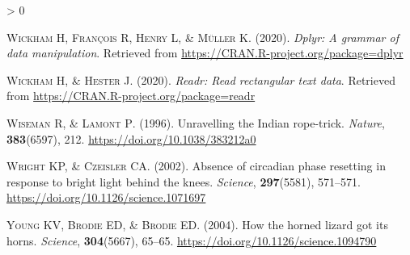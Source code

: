 \documentclass[
  a4paper,
]{article}
\newlength{\cslhangindent}
\newenvironment{CSLReferences}[2] %
 {%
  \setlength{\parindent}{0pt}
  \ifodd #1 \everypar{\setlength{\hangindent}{\cslhangindent}}\ignorespaces\fi
  \ifnum #2 > 0
  \setlength{\parskip}{#2\baselineskip}
  \fi
 }%
 {}
\begin{document}
\begin{CSLReferences}{1}{0}
\leavevmode\hypertarget{ref-R-dplyr}{}%
\textsc{Wickham H, François R, Henry L, \& Müller K}. (2020). \emph{Dplyr: A grammar of data manipulation}. Retrieved from \url{https://CRAN.R-project.org/package=dplyr}

\leavevmode\hypertarget{ref-R-readr}{}%
\textsc{Wickham H, \& Hester J}. (2020). \emph{Readr: Read rectangular text data}. Retrieved from \url{https://CRAN.R-project.org/package=readr}

\leavevmode\hypertarget{ref-wiseman1996}{}%
\textsc{Wiseman R, \& Lamont P}. (1996). Unravelling the {Indian} rope-trick. \emph{Nature}, \textbf{383}(6597), 212. \url{https://doi.org/10.1038/383212a0}

\leavevmode\hypertarget{ref-Wright2002}{}%
\textsc{Wright KP, \& Czeisler CA}. (2002). Absence of circadian phase resetting in response to bright light behind the knees. \emph{Science}, \textbf{297}(5581), 571--571. \url{https://doi.org/10.1126/science.1071697}

\leavevmode\hypertarget{ref-Young2004}{}%
\textsc{Young KV, Brodie ED, \& Brodie ED}. (2004). How the horned lizard got its horns. \emph{Science}, \textbf{304}(5667), 65--65. \url{https://doi.org/10.1126/science.1094790}

\end{CSLReferences}
\end{document}
